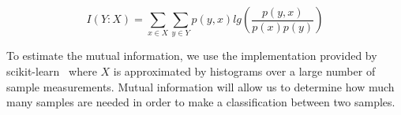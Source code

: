 \begin{equation}\label{MutInformEq}
	I(Y:X) = \sum_{x\in X}\sum_{y\in Y} p(y,x)lg(\frac{p(y,x)}{p(x)p(y)})
\end{equation}

To estimate the mutual information, we use the implementation provided by scikit-learn~\cite{pedregosa_scikit-learn:_2011-1} where $X$ is approximated by histograms over a large number of sample measurements. Mutual information will allow us to determine how much many samples are needed in order to make a classification between two samples. 